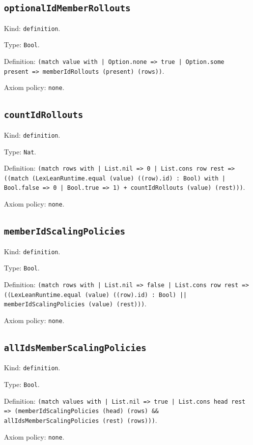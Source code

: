 \documentclass[11pt]{article}
\begin{document}
\subsection*{\texttt{optionalIdMemberRollouts}}
\noindent Kind: \texttt{definition}.\par
\noindent Type: \texttt{Bool}.\par
\noindent Definition: \texttt{(match value with | Option.none => true | Option.some present => memberIdRollouts (present) (rows))}.\par
\noindent Axiom policy: \texttt{none}.\par
\subsection*{\texttt{countIdRollouts}}
\noindent Kind: \texttt{definition}.\par
\noindent Type: \texttt{Nat}.\par
\noindent Definition: \texttt{(match rows with | List.nil => 0 | List.cons row rest => ((match (LexLeanRuntime.equal (value) ((row).id) : Bool) with | Bool.false => 0 | Bool.true => 1) + countIdRollouts (value) (rest)))}.\par
\noindent Axiom policy: \texttt{none}.\par
\subsection*{\texttt{memberIdScalingPolicies}}
\noindent Kind: \texttt{definition}.\par
\noindent Type: \texttt{Bool}.\par
\noindent Definition: \texttt{(match rows with | List.nil => false | List.cons row rest => ((LexLeanRuntime.equal (value) ((row).id) : Bool) || memberIdScalingPolicies (value) (rest)))}.\par
\noindent Axiom policy: \texttt{none}.\par
\subsection*{\texttt{allIdsMemberScalingPolicies}}
\noindent Kind: \texttt{definition}.\par
\noindent Type: \texttt{Bool}.\par
\noindent Definition: \texttt{(match values with | List.nil => true | List.cons head rest => (memberIdScalingPolicies (head) (rows) \&\& allIdsMemberScalingPolicies (rest) (rows)))}.\par
\noindent Axiom policy: \texttt{none}.\par
\end{document}
